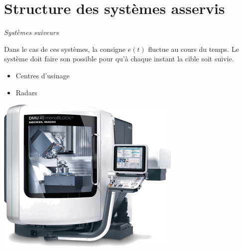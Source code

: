 \documentclass[11pt,oneside]{article}
\begin{document}
\section{Structure des systèmes asservis}

%

\begin{defi}
 \textit{\textsf{Systèmes suiveurs}}

Dans le cas de ces systèmes, la consigne $e(t)$ fluctue au cours du temps. Le système doit faire son possible pour qu'à chaque instant la cible soit suivie.
\end{defi}

\begin{exemple}
\begin{minipage}[c]{.5\textwidth}
 \begin{itemize}
\item Centres d'usinage
\item Radars
\end{itemize}
\end{minipage}
\hfill
\begin{minipage}[c]{.3\textwidth}
\begin{center}
\includegraphics[width=\textwidth]{png/ugv.png}
\end{center}
\end{minipage}
\end{exemple}
\end{document}
